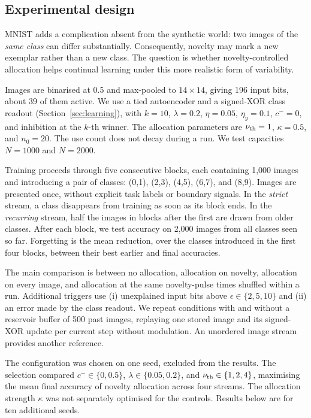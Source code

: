 \documentclass[11pt,a4paper]{article}
\begin{document}
\subsection{Experimental design}
MNIST adds a complication absent from the synthetic world: two images of the \emph{same class} can differ substantially. Consequently, novelty may mark a new exemplar rather than a new class. The question is whether novelty-controlled allocation helps continual learning under this more realistic form of variability.

Images are binarised at 0.5 and max-pooled to $14\times14$, giving 196 input bits, about 39 of them active. We use a tied autoencoder and a signed-XOR class readout (Section~\ref{sec:learning}), with $k=10$, $\lambda=0.2$, $\eta=0.05$, $\eta_y=0.1$, $c^-=0$, and inhibition at the $k$-th winner. The allocation parameters are $\nu_{\rm th}=1$, $\kappa=0.5$, and $n_0=20$. The use count does not decay during a run. We test capacities $N=1000$ and $N=2000$.

Training proceeds through five consecutive blocks, each containing 1{,}000 images and introducing a pair of classes: (0,1), (2,3), (4,5), (6,7), and (8,9). Images are presented once, without explicit task labels or boundary signals. In the \emph{strict} stream, a class disappears from training as soon as its block ends. In the \emph{recurring} stream, half the images in blocks after the first are drawn from older classes. After each block, we test accuracy on 2{,}000 images from all classes seen so far. Forgetting is the mean reduction, over the classes introduced in the first four blocks, between their best earlier and final accuracies.

The main comparison is between no allocation, allocation on novelty, allocation on every image, and allocation at the same novelty-pulse times shuffled within a run. Additional triggers use (i) unexplained input bits above $\epsilon\in\{2,5,10\}$ and (ii) an error made by the class readout. We repeat conditions with and without a reservoir buffer of 500 past images, replaying one stored image and its signed-XOR update per current step without modulation. An unordered image stream provides another reference.

The configuration was chosen on one seed, excluded from the results. The selection compared $c^-\in\{0,0.5\}$, $\lambda\in\{0.05,0.2\}$, and $\nu_{\rm th}\in\{1,2,4\}$, maximising the mean final accuracy of novelty allocation across four streams. The allocation strength $\kappa$ was not separately optimised for the controls. Results below are for ten additional seeds.
\end{document}
